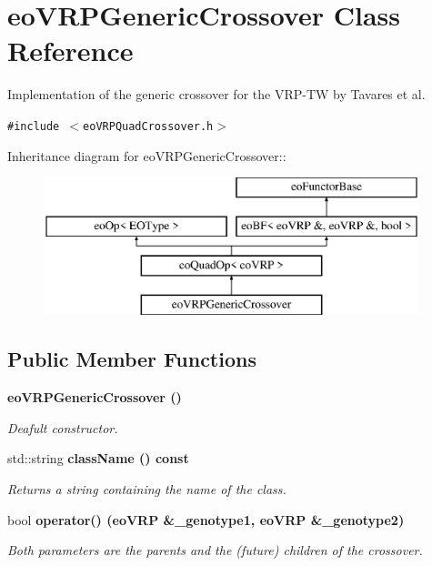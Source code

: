 \section{eo\-VRPGeneric\-Crossover Class Reference}
\label{classeo_v_r_p_generic_crossover}
Implementation of the generic crossover for the VRP-TW by Tavares et al.  


{\tt \#include $<$eo\-VRPQuad\-Crossover.h$>$}

Inheritance diagram for eo\-VRPGeneric\-Crossover::\begin{figure}[H]
\begin{center}
\leavevmode
\includegraphics[height=4cm]{classeo_v_r_p_generic_crossover}
\end{center}
\end{figure}
\subsection*{Public Member Functions}
\begin{CompactItemize}
\item 
\bf{eo\-VRPGeneric\-Crossover} ()\label{classeo_v_r_p_generic_crossover_63e5fb734c46be62a12f6799e34cebe4}

\begin{CompactList}\small\item\em Deafult constructor. \item\end{CompactList}\item 
std::string \bf{class\-Name} () const 
\begin{CompactList}\small\item\em Returns a string containing the name of the class. \item\end{CompactList}\item 
bool \bf{operator()} (\bf{eo\-VRP} \&\_\-genotype1, \bf{eo\-VRP} \&\_\-genotype2)
\begin{CompactList}\small\item\em Both parameters are the parents and the (future) children of the crossover. \item\end{CompactList}\end{CompactItemize}
